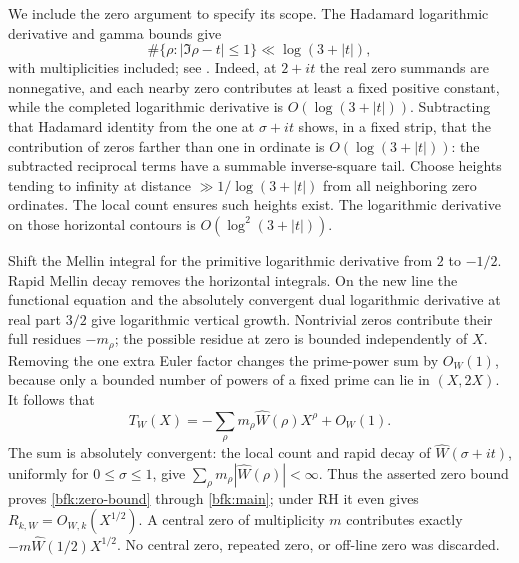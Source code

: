 We include the zero argument to specify its scope.
The Hadamard logarithmic derivative and gamma bounds give
\[
 \#\{\rho:|\Im\rho-t|\le1\}\ll\log(3+|t|),
\]
with multiplicities included; see
\cite[Lemmas~2.2--2.3]{BFKZaman}.
Indeed, at \(2+it\) the real zero summands are nonnegative,
and each nearby zero contributes at least a fixed positive
constant, while the completed logarithmic derivative is
\(O(\log(3+|t|))\).
Subtracting that Hadamard identity from the one at \(\sigma+it\)
shows, in a fixed strip, that the contribution of zeros farther
than one in ordinate is \(O(\log(3+|t|))\): the subtracted
reciprocal terms have a summable inverse-square tail.
Choose heights tending to infinity at distance
\(\gg1/\log(3+|t|)\) from all neighboring zero ordinates.
The local count ensures such heights exist.  The logarithmic
derivative on those horizontal contours is
\(O(\log^2(3+|t|))\).

Shift the Mellin integral for the primitive logarithmic
derivative from \(2\) to \(-1/2\).
Rapid Mellin decay removes the horizontal integrals.
On the new line the functional equation and the absolutely
convergent dual logarithmic derivative at real part \(3/2\)
give logarithmic vertical growth.  Nontrivial zeros contribute
their full residues \(-m_\rho\); the possible residue at zero
is bounded independently of \(X\).
Removing the one extra Euler factor changes the prime-power
sum by \(O_W(1)\), because only a bounded number of powers of a
fixed prime can lie in \((X,2X)\).
It follows that
\begin{equation}
 T_W(X)=-\sum_\rho m_\rho\widehat W(\rho)X^\rho+O_W(1).
 \label{bfk:zeros}
\end{equation}
The sum is absolutely convergent: the local count and rapid
decay of \(\widehat W(\sigma+it)\), uniformly for \(0\le\sigma\le1\),
give \(\sum_\rho m_\rho|\widehat W(\rho)|<\infty\).
Thus the asserted zero bound proves \eqref{bfk:zero-bound} through
\eqref{bfk:main}; under RH it even gives
\(R_{k,W}=O_{W,k}(X^{1/2})\).
A central zero of multiplicity \(m\) contributes exactly
\(-m\widehat W(1/2)X^{1/2}\).  No central zero, repeated zero,
or off-line zero was discarded.

